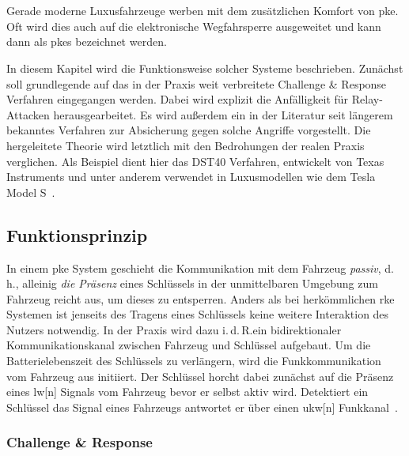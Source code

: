 \chapter{}

Gerade moderne Luxusfahrzeuge werben mit dem zusätzlichen Komfort von \gls{pke}. Oft wird dies auch auf die elektronische Wegfahrsperre ausgeweitet und kann dann als \gls{pkes} bezeichnet werden.

In diesem Kapitel wird die Funktionsweise solcher Systeme beschrieben. Zunächst soll grundlegende auf das in der Praxis weit verbreitete \foreignlanguage{english}{Challenge \& Response} Verfahren eingegangen werden. Dabei wird explizit die Anfälligkeit für \foreignlanguage{english}{Relay}-Attacken herausgearbeitet. Es wird außerdem ein in der Literatur seit längerem bekanntes Verfahren zur Absicherung gegen solche Angriffe vorgestellt. Die hergeleitete Theorie wird letztlich mit den Bedrohungen der realen Praxis verglichen. Als Beispiel dient hier das DST40 Verfahren, entwickelt von Texas Instruments und unter anderem verwendet in Luxusmodellen wie dem Tesla Model S~\cite{Wouters2019}.

\section{Funktionsprinzip}

In einem \gls{pke} System geschieht die Kommunikation mit dem Fahrzeug \emph{passiv}, d.\,h., alleinig \emph{die Präsenz} eines Schlüssels in der unmittelbaren Umgebung zum Fahrzeug reicht aus, um dieses zu entsperren. Anders als bei herkömmlichen \gls{rke} Systemen ist jenseits des Tragens eines Schlüssels keine weitere Interaktion des Nutzers notwendig. In der Praxis wird dazu i.\,d.\,R.\@ ein bidirektionaler Kommunikationskanal zwischen Fahrzeug und Schlüssel aufgebaut. Um die Batterielebenszeit des Schlüssels zu verlängern, wird die Funkkommunikation vom Fahrzeug aus initiiert. Der Schlüssel horcht dabei zunächst auf die Präsenz eines \gls{lw}[n] Signals vom Fahrzeug bevor er selbst aktiv wird. Detektiert ein Schlüssel das Signal eines Fahrzeugs antwortet er über einen \gls{ukw}[n] Funkkanal~\cite{Alrabady2005,Verdult2015,Garcia2016}.

\subsection{\foreignlanguage{english}{Challenge \& Response}}

